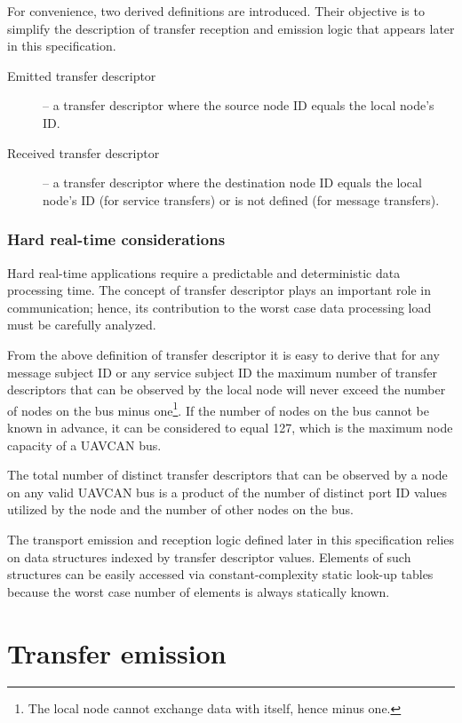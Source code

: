 For convenience, two derived definitions are introduced.
Their objective is to simplify the description of transfer reception and emission logic that appears later in this
specification.
\begin{description}
    \item[Emitted transfer descriptor] -- a transfer descriptor where the source node ID equals the local node's ID.
    \item[Received transfer descriptor] -- a transfer descriptor where the destination node ID equals
    the local node's ID (for service transfers) or is not defined (for message transfers).
\end{description}

\subsubsection{Hard real-time considerations}

Hard real-time applications require a predictable and deterministic data processing time.
The concept of transfer descriptor plays an important role in communication;
hence, its contribution to the worst case data processing load must be carefully analyzed.

From the above definition of transfer descriptor it is easy to derive that for any
message subject ID or any service subject ID the maximum number of transfer descriptors
that can be observed by the local node will never exceed the number of nodes on the bus minus
one\footnote{The local node cannot exchange data with itself, hence minus one.}.
If the number of nodes on the bus cannot be known in advance, it can be considered to equal 127,
which is the maximum node capacity of a UAVCAN bus.

The total number of distinct transfer descriptors that can be observed by a node on any valid UAVCAN bus
is a product of the number of distinct port ID values utilized by the node and the number of other nodes on the bus.

The transport emission and reception logic defined later in this specification relies on data structures
indexed by transfer descriptor values.
Elements of such structures can be easily accessed via constant-complexity static look-up tables
because the worst case number of elements is always statically known.

\section{Transfer emission}


